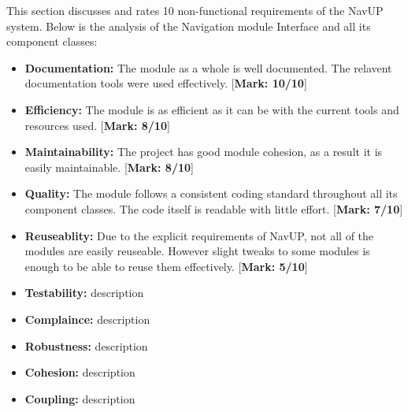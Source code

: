 \documentclass[runningheads,a4paper]{article}
\begin{document}
	This section discusses and rates 10 non-functional requirements of the NavUP system.
	Below is the analysis of the Navigation module Interface and all its component classes:
	
	\begin{itemize}
		\item \textbf{Documentation:}
			The module as a whole is well documented. The relavent documentation tools were used effectively. [\textbf{Mark: 10/10}]
			
		\item \textbf{Efficiency:} The module is as efficient as it can be with the current tools and resources used. [\textbf{Mark: 8/10}]
		
		\item \textbf{Maintainability:} The project has good module cohesion, as a result it is easily maintainable. [\textbf{Mark: 8/10}]
		
		\item \textbf{Quality:} The module follows a consistent coding standard throughout all its component classes. The code itself is readable with little effort. [\textbf{Mark: 7/10}]
		
		\item \textbf{Reuseablity:} Due to the explicit requirements of NavUP, not all of the modules are easily reuseable. However slight tweaks to some modules is enough to be able to reuse them effectively. [\textbf{Mark: 5/10}]
		
		\item \textbf{Testability:} description
		\item \textbf{Complaince:} description
		\item \textbf{Robustness:} description
		\item \textbf{Cohesion:} description
		\item \textbf{Coupling:} description\\
		
	\end{itemize}
	
	

\end{document}
